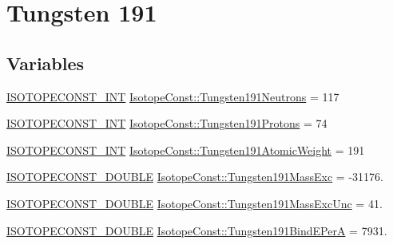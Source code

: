 \hypertarget{group___isotope_const-_tungsten-_w191}{}\section{Tungsten 191}
\label{group___isotope_const-_tungsten-_w191}
\subsection*{Variables}
\begin{DoxyCompactItemize}
\item 
\mbox{\hyperlink{group___isotope_const-_macros_ga5f18360b3e99483a35c32d789e62621c}{I\+S\+O\+T\+O\+P\+E\+C\+O\+N\+S\+T\+\_\+\+I\+NT}} \mbox{\hyperlink{group___isotope_const-_tungsten-_w191_ga571cf08f3cf964dc526301a3c9a78640}{Isotope\+Const\+::\+Tungsten191\+Neutrons}} = 117
\item 
\mbox{\hyperlink{group___isotope_const-_macros_ga5f18360b3e99483a35c32d789e62621c}{I\+S\+O\+T\+O\+P\+E\+C\+O\+N\+S\+T\+\_\+\+I\+NT}} \mbox{\hyperlink{group___isotope_const-_tungsten-_w191_gaae91eeafe450242c982af81bf58c5bf6}{Isotope\+Const\+::\+Tungsten191\+Protons}} = 74
\item 
\mbox{\hyperlink{group___isotope_const-_macros_ga5f18360b3e99483a35c32d789e62621c}{I\+S\+O\+T\+O\+P\+E\+C\+O\+N\+S\+T\+\_\+\+I\+NT}} \mbox{\hyperlink{group___isotope_const-_tungsten-_w191_ga97ad4913d5d8dc5756c223ecb1fd4162}{Isotope\+Const\+::\+Tungsten191\+Atomic\+Weight}} = 191
\item 
\mbox{\hyperlink{group___isotope_const-_macros_ga8f45a7272ce02c0b4c65c44636ed719a}{I\+S\+O\+T\+O\+P\+E\+C\+O\+N\+S\+T\+\_\+\+D\+O\+U\+B\+LE}} \mbox{\hyperlink{group___isotope_const-_tungsten-_w191_ga657814f78df6fd05f6ed7c0db92e93d2}{Isotope\+Const\+::\+Tungsten191\+Mass\+Exc}} = -\/31176.
\item 
\mbox{\hyperlink{group___isotope_const-_macros_ga8f45a7272ce02c0b4c65c44636ed719a}{I\+S\+O\+T\+O\+P\+E\+C\+O\+N\+S\+T\+\_\+\+D\+O\+U\+B\+LE}} \mbox{\hyperlink{group___isotope_const-_tungsten-_w191_gae8f783f15e20706c499a23b20addbf8b}{Isotope\+Const\+::\+Tungsten191\+Mass\+Exc\+Unc}} = 41.
\item 
\mbox{\hyperlink{group___isotope_const-_macros_ga8f45a7272ce02c0b4c65c44636ed719a}{I\+S\+O\+T\+O\+P\+E\+C\+O\+N\+S\+T\+\_\+\+D\+O\+U\+B\+LE}} \mbox{\hyperlink{group___isotope_const-_tungsten-_w191_gac65febb9c639392e1275a545e289e793}{Isotope\+Const\+::\+Tungsten191\+Bind\+E\+PerA}} = 7931.
\item 

\end{DoxyCompactItemize}
